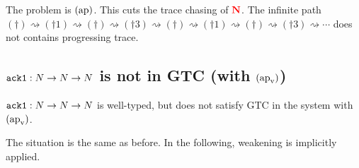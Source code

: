 \documentclass{article}
\newcommand{\bfColor}[2]{{\bf \color{#1}{#2}}}
\newcommand{\Rapv}{\hbox{$(\text{ap}_{\text{v}})$}}
\newcommand{\Rap}{\hbox{$(\text{ap})$}}
\newcommand{\AckA}{{\tt ack1}}
\newcommand{\N}{N}
\newcommand{\rN}{\bfColor{red}{N}}
\newenvironment{claim}[1][Claim]{\begin{trivlist}
\item[\hskip \labelsep {\bfseries #1}]}{\end{trivlist}}
\begin{document}
The problem is $\Rap$.
This cuts the trace chasing of $\rN$. 
The infinite path $(\dagger)\rightsquigarrow(\dagger1)\rightsquigarrow(\dagger)\rightsquigarrow(\dagger3)\rightsquigarrow(\dagger)\rightsquigarrow(\dagger1)\rightsquigarrow(\dagger)\rightsquigarrow(\dagger3)\rightsquigarrow\cdots$ does not contains progressing trace. 

\subsection{$\AckA:\N\to\N\to\N$ is not in GTC (with $\Rapv$)}

\begin{claim}
  $\AckA:\N\to\N\to\N$ is well-typed, but does not satisfy GTC in the system with $\Rapv$.
\end{claim}

The situation is the same as before. In the following, weakening is implicitly applied. 
\end{document}
